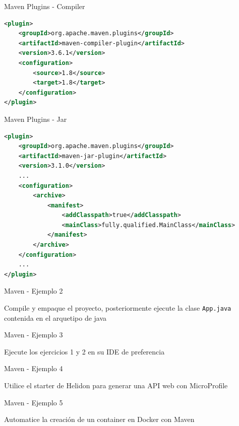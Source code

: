 \documentclass[aspectratio=169]{beamer}
\begin{document}
\begin{frame}[fragile]{Maven Plugins - Compiler}

\begin{lstlisting}[language=xml]
<plugin>
    <groupId>org.apache.maven.plugins</groupId>
    <artifactId>maven-compiler-plugin</artifactId>
    <version>3.6.1</version>
    <configuration>
        <source>1.8</source>
        <target>1.8</target>
    </configuration>
</plugin>
\end{lstlisting}
\end{frame}

\begin{frame}[fragile]{Maven Plugins - Jar}

{\tiny
\begin{lstlisting}[language=xml]
<plugin>
    <groupId>org.apache.maven.plugins</groupId>
    <artifactId>maven-jar-plugin</artifactId>
    <version>3.1.0</version>
    ...
    <configuration>
        <archive>
            <manifest>
                <addClasspath>true</addClasspath>
                <mainClass>fully.qualified.MainClass</mainClass>
            </manifest>
        </archive>
    </configuration>
    ...
</plugin>
\end{lstlisting}
}
\end{frame}

\begin{frame}{Maven - Ejemplo 2}

Compile y empaque el proyecto, posteriormente ejecute la clase \texttt{App.java} contenida en el arquetipo de java

\end{frame}

\begin{frame}{Maven - Ejemplo 3}

Ejecute los ejercicios 1 y 2 en su IDE de preferencia

\end{frame}


\begin{frame}{Maven - Ejemplo 4}

Utilice el starter de Helidon para generar una API web con MicroProfile

\end{frame}

\begin{frame}{Maven - Ejemplo 5}

Automatice la creación de un container en Docker con Maven

\end{frame}
\end{document}
